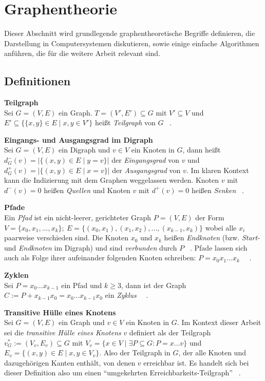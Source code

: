 \section{Graphentheorie}

Dieser Abschnitt wird grundlegende graphentheoretische Begriffe definieren, die Darstellung in Computersystemen diskutieren, sowie einige einfache Algorithmen anführen, die für die weitere Arbeit relevant sind.

\subsection{Definitionen}


\textbf{Teilgraph} \\
Sei $G = (V, E)$ ein Graph. $T = (V', E') \subseteq G$ mit $V' \subseteq V$ und $E' \subseteq \{\{x,y\} \in E \mid x, y \in V'\}$ heißt \textit{Teilgraph} von $G$ ~\cite[S.~4]{Diestel.2016}.  


\textbf{Eingangs- und Ausgangsgrad im Digraph} \\
Sei $G = (V, E)$ ein Digraph und $v \in V$ ein Knoten in $G$, dann heißt $d^-_G(v) = | \{(x, y) \in E \mid y = v\} |$ der \textit{Eingangsgrad} von $v$ und $d^+_G(v) = | \{(x, y) \in E \mid x = v\} |$ der \textit{Ausgangsgrad} von $v$. Im klaren Kontext kann die Indizierung mit dem Graphen weggelassen werden. Knoten $v$ mit $d^-(v) = 0$ heißen  \textit{Quellen} und Knoten $v$ mit $d^+(v) = 0$ heißen  \textit{Senken} ~\cite[S.~460]{Satyanarayana.2014}.

\textbf{Pfade} \\ 
Ein \textit{Pfad} ist ein nicht-leerer, gerichteter Graph $P = (V, E)$ der Form $V = \{x_0, x_1, ..., x_k\};~E=\{(x_0,x_1), (x_1, x_2), ..., (x_{k-1}, x_k)\}$ wobei alle $x_i$ paarweise verschieden sind. Die Knoten $x_0$ und $x_k$ heißen \textit{Endknoten} (bzw. \textit{Start-} und \textit{Endknoten} im Digraph) und sind \textit{verbunden} durch $P$ ~\cite[S.~6]{Diestel.2016}. Pfade lassen sich auch als Folge ihrer aufeinander folgenden Knoten schreiben: $P = x_0x_1...x_k$ ~\cite[S.~7]{Diestel.2016}~\cite[S.~475]{Sedgewick.1992}. 


\textbf{Zyklen} \\
Sei $P = x_0...x_{k-1}$ ein Pfad und $k \geq 3$, dann ist der Graph $C := P + x_{k-1}x_0 = x_0...x_{k-1}x_0$ ein \textit{Zyklus} ~\cite[S.~8]{Diestel.2016}~\cite[S.~475]{Sedgewick.1992}.


\textbf{Transitive Hülle eines Knotens} \\
Sei $G = (V, E)$ ein Graph und $v \in V$ ein Knoten in $G$. Im Kontext
 dieser Arbeit sei die \textit{transitive Hülle eines Knotens} $v$ definiert
  als der Teilgraph $v^*_G := (V_v, E_v) \subseteq G$ 
  mit $V_v = \{x \in V \mid \exists P \subseteq G: P=x...v\}$ 
  und $E_v = \{ (x,y) \in E \mid x,y \in V_v \}$. 
  Also der Teilgraph in $G$, der alle Knoten und dazugehörigen Kanten enthält, von denen $v$ erreichbar ist. Es handelt sich bei dieser Definition also um einen \enquote{umgekehrten Erreichbarkeits-Teilgraph} ~\cite[S.~41--42]{Sandner.01.09.1998}.



